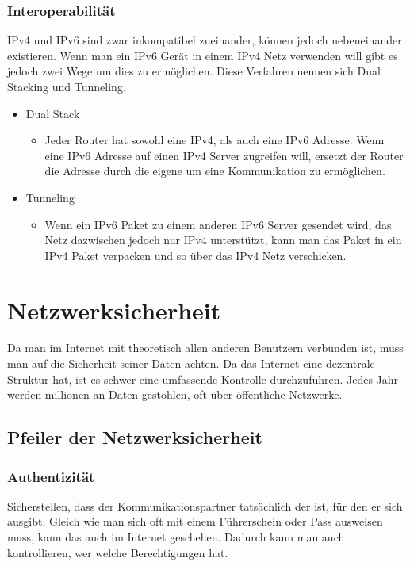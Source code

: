 \documentclass{article}
\begin{document}
	  \subsubsection{Interoperabilität}
	  IPv4 und IPv6 sind zwar inkompatibel zueinander, können jedoch nebeneinander existieren. Wenn man ein IPv6 Gerät in einem IPv4 Netz verwenden will gibt es jedoch zwei Wege um dies zu ermöglichen. Diese Verfahren nennen sich Dual Stacking und Tunneling.
	  \begin{itemize}
	  	 	\item{Dual Stack}
	  	 	\begin{itemize}
	  	 		\item{Jeder Router hat sowohl eine IPv4, als auch eine IPv6 Adresse. Wenn eine IPv6 Adresse auf einen IPv4 Server zugreifen will, ersetzt der Router die Adresse durch die eigene um eine Kommunikation zu ermöglichen.}
	  	 	\end{itemize}
	  	 	\item{Tunneling}
	  	 	\begin{itemize}
	  	 		\item{Wenn ein IPv6 Paket zu einem anderen IPv6 Server gesendet wird, das Netz dazwischen jedoch nur IPv4 unterstützt, kann man das Paket in ein IPv4 Paket verpacken und so über das IPv4 Netz verschicken.}
	  	 	\end{itemize}
	  \end{itemize}	
	  \section{Netzwerksicherheit} 
	  Da man im Internet mit theoretisch allen anderen Benutzern verbunden ist, muss man auf die Sicherheit seiner Daten achten. Da das Internet eine dezentrale Struktur hat, ist es schwer eine umfassende Kontrolle durchzuführen. Jedes Jahr werden millionen an Daten gestohlen, oft über öffentliche Netzwerke.
	  \subsection{Pfeiler der Netzwerksicherheit}
	  \subsubsection{Authentizität}
	  Sicherstellen, dass der Kommunikationspartner tatsächlich der ist, für den er sich ausgibt. Gleich wie man sich oft mit einem Führerschein oder Pass ausweisen muss, kann das auch im Internet geschehen. Dadurch kann man auch kontrollieren, wer welche Berechtigungen hat.
\end{document}
